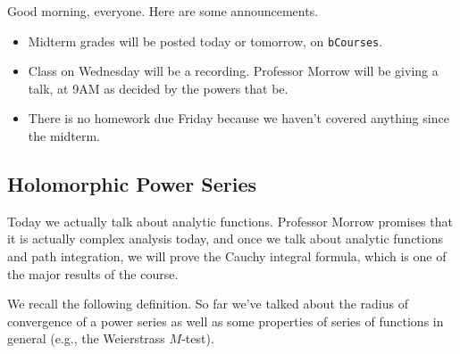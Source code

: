 \documentclass[../notes.tex]{subfiles}
\begin{document}

Good morning, everyone. Here are some announcements.
\begin{itemize}
	\item Midterm grades will be posted today or tomorrow, on \texttt{bCourses}.
	\item Class on Wednesday will be a recording. Professor Morrow will be giving a talk, at 9AM as decided by the powers that be.
	\item There is no homework due Friday because we haven't covered anything since the midterm.
\end{itemize}

\subsection{Holomorphic Power Series}
Today we actually talk about analytic functions. Professor Morrow promises that it is actually complex analysis today, and once we talk about analytic functions and path integration, we will prove the Cauchy integral formula, which is one of the major results of the course.

We recall the following definition.
\powerseriesdefi*
\noindent So far we've talked about the radius of convergence of a power series as well as some properties of series of functions in general (e.g., the Weierstrass $M$-test).
\end{document}
